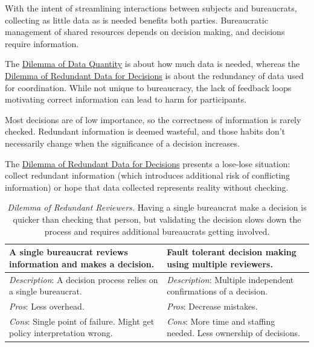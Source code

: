 With the intent of streamlining interactions between subjects and bureaucrats, collecting as little data as is needed benefits both parties. Bureaucratic management of shared resources depends on decision making, and decisions require information. 


The \hyperref[table:dilemma-personal-gather-data-lots-vs-little]{Dilemma of Data Quantity} is about how much data is needed, whereas the \hyperref[table:dilemma-personal-single-bit-decision]{Dilemma of Redundant Data for Decisions} is about the redundancy of data used for coordination. While not unique to bureaucracy, the lack of feedback loops motivating correct information can lead to harm for participants.

Most decisions are of low importance, so the correctness of information is rarely checked. Redundant information is deemed wasteful, and those habits don't necessarily change when the significance of a decision increases. 

The \hyperref[table:dilemma-personal-single-bit-decision]{Dilemma of Redundant Data for Decisions} presents a lose-lose situation: collect redundant information (which introduces additional risk of conflicting information) or hope that data collected represents reality without checking. 


\begin{center}
\begin{table}[H] %
\begin{tabular}{ | m{\dilemmatablewidth}| m{\dilemmatablewidth} | } 
  \hline
  \textbf{A single bureaucrat reviews information and makes a decision.} & 
  \textbf{Fault tolerant decision making using multiple reviewers.} \\ 
  \hline
  \textit{Description}: A decision process relies on a single bureaucrat. & 
  \textit{Description}: Multiple independent confirmations of a decision.  \\
  \hline
  \textit{Pros}: Less overhead. & 
  \textit{Pros}: Decrease mistakes. \\
  \hline
  \textit{Cons}: Single point of failure. Might get policy interpretation wrong. &
  \textit{Cons}: More time and staffing needed. Less ownership of decisions. \\  
  \hline
\end{tabular}
\caption{
\textit{Dilemma of Redundant Reviewers.}
Having a single bureaucrat make a decision is quicker than checking that person, but validating the decision slows down the process and requires additional bureaucrats getting involved.
}
\label{table:dilemma-personal-redundant-reviewers}
\end{table}
\end{center}


